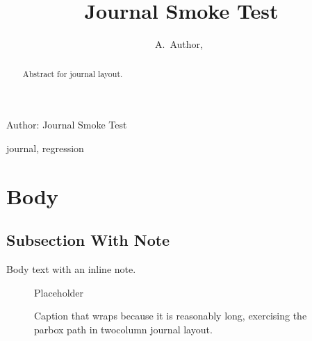 \documentclass[journal]{IEEEtran}
\begin{document}
\title{Journal Smoke Test}
\author{A.~Author,~}

  {Author: Journal Smoke Test}

\maketitle

\begin{abstract}
 Abstract for journal layout. \lipsum[1][1-3]
\end{abstract}

\begin{IEEEkeywords}
journal, regression
\end{IEEEkeywords}

\IEEEpeerreviewmaketitle

\section{Body}
\subsection{Subsection With Note}
Body text with  an inline note. \lipsum[1]

\begin{figure}[t]
  \centering Placeholder
  \caption{Caption that wraps because it is reasonably long, exercising
    the parbox path in twocolumn journal layout.}
  \label{fig:journal}
\end{figure}

\lipsum[2-4]
\end{document}
